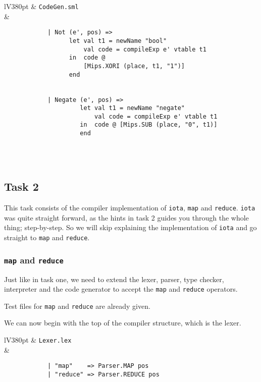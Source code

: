 \documentclass[a4paper]{article}
\begin{document}
\begin{center}	
	\begin{tabular}{lV{380pt}}
		\toprule
		& \verb|CodeGen.sml|\\
		\midrule
		&
		\begin{verbatim}
			| Not (e', pos) =>
			      let val t1 = newName "bool"
			          val code = compileExp e' vtable t1
			      in  code @ 
			          [Mips.XORI (place, t1, "1")]
			      end
			
			
			| Negate (e', pos) =>
			         let val t1 = newName "negate"
			             val code = compileExp e' vtable t1
			         in  code @ [Mips.SUB (place, "0", t1)]
			         end
		\end{verbatim}
		\\
		\bottomrule \\
	\end{tabular}
\end{center}

\subsection{Task 2}
This task consists of the compiler implementation of \verb|iota|, \verb|map| and \verb|reduce|. \verb|iota| was quite straight forward, as the hints in task 2 guides you through the whole thing; step-by-step. So we will skip explaining the implementation of \verb|iota| and go straight to \verb|map| and \verb|reduce|.

\subsubsection{\texttt{map} and \texttt{reduce}}
Just like in task one, we need to extend the lexer, parser, type checker, interpreter and the code generator to accept the \verb|map| and \verb|reduce| operators.
	
Test files for \verb|map| and \verb|reduce| are already given.

We can now begin with the top of the compiler structure, which is the lexer.
	
\begin{center}	
	\begin{tabular}{lV{380pt}}
		\toprule
		& \verb|Lexer.lex|\\
		\midrule
		&
		\begin{verbatim}
			| "map"    => Parser.MAP pos
			| "reduce" => Parser.REDUCE pos
		\end{verbatim}
		\\
		\bottomrule \\
	\end{tabular}
\end{center}
\end{document}
